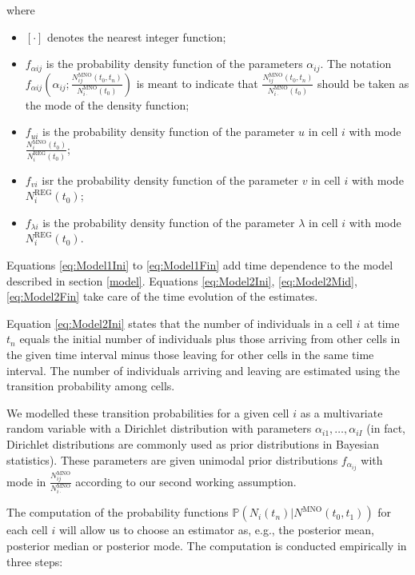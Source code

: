 \documentclass[12pt, a4paper]{article}
\begin{document}
\noindent where 

\begin{itemize}
	\item $[\cdot]$ denotes the nearest integer function;
	\item $f_{\alpha ij}$ is the probability density function of the parameters $\alpha_{ij}$. The 
	notation $f_{\alpha ij}\left(\alpha_{ij}; \frac{N_{ij}^{\textrm{MNO}}(t_{0}, t_{n})}{N_{i\cdot}^{\textrm{MNO}}(t_{0})}\right)$ is meant to 
	indicate that $\frac{N_{ij}^{\textrm{MNO}}(t_{0}, t_{n})}{N_{i\cdot}^{\textrm{MNO}}(t_{0})}$ should be taken as the mode of the density function;
	\item $f_{ui}$ is the probability density function of the parameter $u$ in cell $i$ with mode $\frac{N_{i}^{\textrm{MNO}}(t_{0})}{N_{i}^{\textrm{REG}}(t_{0})}$;
	\item $f_{vi}$ isr the probability density function of the parameter $v$  in cell $i$ with mode $N_{i}^{\textrm{REG}}(t_{0})$;
	\item $f_{\lambda i}$ is the probability density function of the parameter $\lambda$ in cell $i$ with mode $N_{i}^{\textrm{REG}}(t_{0})$. 
\end{itemize}


Equations \eqref{eq:Model1Ini} to \eqref{eq:Model1Fin} add time dependence to the model described 
in section \ref{model}. Equations \eqref{eq:Model2Ini}, \eqref{eq:Model2Mid}, \eqref{eq:Model2Fin} 
take care of the time evolution of the estimates.

Equation \eqref{eq:Model2Ini} states that the number of individuals in a cell $i$ at time $t_{n}$ equals 
the initial number of individuals plus those arriving from other cells in the given time interval minus those 
leaving for other cells in the same time interval. The number of individuals arriving and leaving 
are estimated using the transition probability among cells.

We modelled these transition probabilities for a given cell $i$ as a multivariate random variable with 
a Dirichlet distribution with parameters $\alpha_{i1},\dots,\alpha_{iI}$ (in fact, Dirichlet distributions 
are commonly used as prior distributions in Bayesian statistics). These parameters  are given unimodal 
prior distributions $f_{\alpha_{ij}}$ with mode in $\frac{N_{ij}^{\textrm{MNO}}}{N_{i\cdot}^{\textrm{MNO}}}$ according to 
our second working assumption.

The computation of the probability functions $\mathbb{P}\left(N_{i}(t_{n})\big|N^{\textrm{MNO}}(t_{0}, t_{1})\right)$ for 
each cell $i$ will allow us to choose an estimator as, e.g., the posterior mean, posterior median or 
posterior mode. The computation is conducted empirically in three steps:
\end{document}
